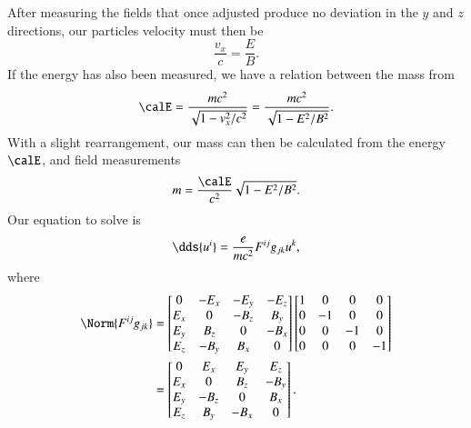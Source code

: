 {After measuring the fields that once adjusted produce no deviation in the \(y\) and \(z\) directions, our particles velocity must then be
%
\begin{equation}\label{eqn:relElectroDynProblemSet2:430}
\frac{v_x}{c} = \frac{E}{B}.
\end{equation}
%
If the energy has also been measured, we have a relation between the mass from
%
\begin{equation}\label{eqn:relElectroDynProblemSet2:450}
\calE = \frac{m c^2}{\sqrt{1 - v_x^2/c^2}} = \frac{ m c^2 }{ \sqrt{ 1 - E^2/B^2 }}.
\end{equation}
%
With a slight rearrangement, our mass can then be calculated from the energy \(\calE\), and field measurements
%
\begin{equation}\label{eqn:relElectroDynProblemSet2:470}
m = \frac{ \calE }{c^2} \sqrt{ 1 - E^2/B^2 }.
\end{equation}
%
%
%
Our equation to solve is
%
\begin{equation}\label{eqn:relElectroDynProblemSet2:490}
\dds{u^i} = \frac{e}{m c^2} F^{ij} g_{jk} u^k,
\end{equation}
%
where
%
\begin{equation}\label{eqn:relElectroDynProblemSet2:510}
\begin{aligned}
\Norm{ F^{ij} g_{jk} }
&=
\begin{bmatrix}
0 & -E_x & -E_y & -E_z \\
E_x & 0 & -B_z & B_y \\
E_y & B_z & 0 & -B_x \\
E_z & -B_y & B_x & 0
\end{bmatrix}
\begin{bmatrix}
1 & 0 & 0 & 0 \\
0 & -1 & 0 & 0 \\
0 & 0 & -1 & 0 \\
0 & 0 & 0 & -1 \\
\end{bmatrix} \\
&=
\begin{bmatrix}
0 & E_x & E_y & E_z \\
E_x & 0 & B_z & -B_y \\
E_y & -B_z & 0 & B_x \\
E_z & B_y & -B_x & 0
\end{bmatrix}.
\end{aligned}
\end{equation}
}
